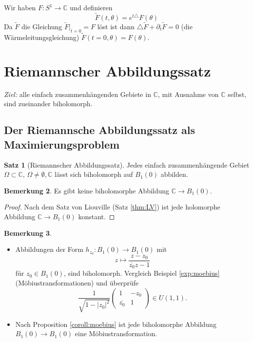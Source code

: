 \documentclass[11pt,titlepage]{article}
\theoremstyle{definition}
\newtheorem{theorem}{Satz}[section]
\newtheorem{remark}[theorem]{Bemerkung}
\theoremstyle{remark}
\begin{document}
	 Wir haben $F:S^1\to\mathbb{C}$ und definieren
	\[ \tilde{F}(t,\theta)=e^{t\triangle} F(\theta) \]
	Da $\tilde{F}$ die Gleichung $\tilde{F}|_{t=0}=F$ löst ist dann $\triangle\tilde{F}+\partial_t \tilde{F}=0$ 
	(die Wärmeleitungsgleichung) $\tilde{F}(t=0,\theta)=F(\theta)$.
	
	\section{Riemannscher Abbildungssatz}
	
	\textsl{Ziel:} alle einfach zusammenhängenden Gebiete in $\mathbb{C}$, mit Ausnahme von $\mathbb{C}$ 
	selbst, sind zueinander biholomorph.
	
	\subsection{Der Riemannsche Abbildungssatz als Maximierungsproblem}
	
	\begin{theorem}[Riemannscher Abbildungssatz] \label{thm:RA}
		Jedes einfach zusammenhängende Gebiet $\Omega\subset\mathbb{C}$, $\Omega\neq\emptyset,\mathbb{C}$ 
		lässt sich biholomorph auf $B_1(0)$ abbilden.
	\end{theorem}
	
	\begin{remark}
		Es gibt keine biholomorphe Abbildung $\mathbb{C}\to B_1(0)$.
	\end{remark}
	
	\begin{proof}
		Nach dem Satz von Liouville (Satz \ref{thm:LV}) ist jede holomorphe Abbildung $\mathbb{C}\to B_1(0)$ 
		konstant.
	\end{proof}
	
	\begin{remark} \label{rem:bihol}
		\begin{itemize}
			\item Abbildungen der Form $h_{z_0}:B_1(0)\to B_1(0)$ mit 
			\[z\mapsto \frac{z-z_0}{\overline{z_0}z-1}\] 
			für $z_0\in B_1(0)$, sind biholomorph. Vergleich Beispiel \ref{exp:moebius} 
			(Möbiustransformationen) und überprüfe
			\[ \frac{1}{\sqrt{1-|z_0|^2}}\begin{pmatrix} 1 & -z_0 \\ \overline{z_0} & 1 \end{pmatrix}\in U(1,1). \]
			
			\item Nach Proposition \ref{coroll:moebius} ist jede biholomorphe Abbildung 
			$B_1(0)\to B_1(0)$ eine Möbiustransformation.
		\end{itemize}
	\end{remark}
	
\end{document}
